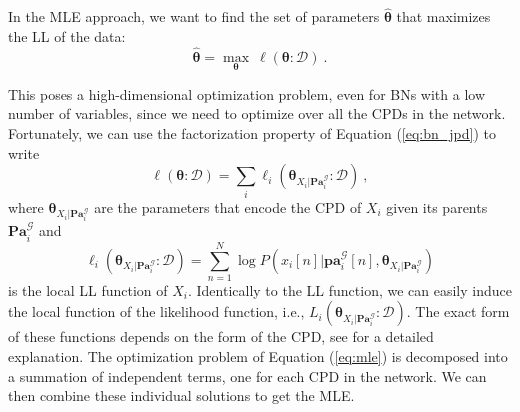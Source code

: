 In the MLE approach, we want to find the set of parameters $\hat{\bm{\theta}}$ that maximizes the LL of the data:
\begin{equation} \label{eq:mle}
\hat{\bm{\theta}} = \underset{\bm{\theta}}{\max} \ \ell(\bm{\theta}: \mathcal{D}) \ .
\end{equation}

This poses a high-dimensional optimization problem, even for BNs with a low number of variables, since we need to optimize over all the CPDs in the network. Fortunately, we can use the factorization property of Equation (\ref{eq:bn_jpd}) to write
\begin{equation} \label{eq:mle_decomposed}
\ell(\bm{\theta}: \mathcal{D}) = \sum_{i} \ell_{i}(\bm{\theta}_{X_{i}|\mathbf{Pa}^{\mathcal{G}}_{i}}: \mathcal{D}) \ ,
\end{equation}
where $\bm{\theta}_{X_{i}|\mathbf{Pa}^{\mathcal{G}}_{i}}$ are the parameters that encode the CPD of $X_{i}$ given its parents $\mathbf{Pa}^{\mathcal{G}}_{i}$ and
\begin{equation*} 
\ell_{i}(\bm{\theta}_{X_{i}|\mathbf{Pa}^{\mathcal{G}}_{i}}: \mathcal{D}) = \sum_{n=1}^{N} \log P(x_{i}[n] | \mathbf{pa}^{\mathcal{G}}_{i}[n], \bm{\theta}_{X_{i} | \mathbf{Pa}^{\mathcal{G}}_{i}}) 
\end{equation*}
is the local LL function of $X_{i}$. Identically to the LL function, we can easily induce the local function of the likelihood function, i.e., $L_{i}(\bm{\theta}_{X_{i}|\mathbf{Pa}^{\mathcal{G}}_{i}}: \mathcal{D})$. The exact form of these functions depends on the form of the CPD, see \cite{koller2009} for a detailed explanation. The optimization problem of Equation (\ref{eq:mle}) is decomposed into a summation of independent terms, one for each CPD in the network. We can then combine these individual solutions to get the MLE.

 
 
